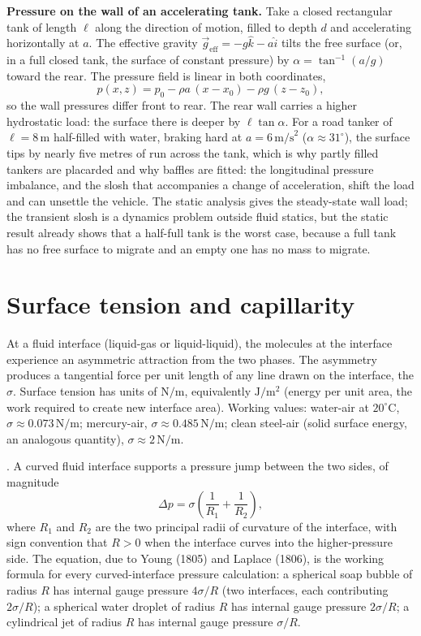 \begin{mastery}
\textbf{Pressure on the wall of an accelerating tank.} Take a closed
rectangular tank of length $\ell$ along the direction of motion, filled
to depth $d$ and accelerating horizontally at $a$. The effective gravity
$\vec{g}_{\text{eff}} = -g\hat{k} - a\hat{i}$ tilts the free surface (or,
in a full closed tank, the surface of constant pressure) by
$\alpha = \tan^{-1}(a/g)$ toward the rear. The pressure field is linear
in both coordinates,
\[
p(x,z) = p_0 - \rho a\,(x - x_0) - \rho g\,(z - z_0),
\]
so the wall pressures differ front to rear. The rear wall carries a
higher hydrostatic load: the surface there is deeper by
$\ell\tan\alpha$. For a road tanker of $\ell = 8\,\si{\meter}$
half-filled with water, braking hard at $a = 6\,\text{m/s}^2$
($\alpha \approx 31^{\circ}$), the surface tips by nearly five metres of
run across the tank, which is why partly filled tankers are placarded and
why baffles are fitted: the longitudinal pressure imbalance, and the
slosh that accompanies a change of acceleration, shift the load and can
unsettle the vehicle. The static analysis gives the steady-state wall
load; the transient slosh is a dynamics problem outside fluid statics,
but the static result already shows that a half-full tank is the worst
case, because a full tank has no free surface to migrate and an empty
one has no mass to migrate.
\end{mastery}

\section{Surface tension and capillarity}

At a fluid interface (liquid-gas or liquid-liquid), the molecules
at the interface experience an asymmetric attraction from the
two phases. The asymmetry produces a tangential force per unit
length of any line drawn on the interface, the
 $\sigma$. Surface tension has units of
$\text{N}/\text{m}$, equivalently $\text{J}/\text{m}^2$
(energy per unit area, the work required to create new interface
area). Working values: water-air at $20^{\circ}\text{C}$,
$\sigma \approx 0.073\,\text{N}/\text{m}$; mercury-air,
$\sigma \approx 0.485\,\text{N}/\text{m}$; clean steel-air
(solid surface energy, an analogous quantity), $\sigma \approx
2\,\text{N}/\text{m}$.

. A curved fluid interface
supports a pressure jump between the two sides, of magnitude
\[
\Delta p = \sigma \left(\frac{1}{R_1} + \frac{1}{R_2}\right),
\]
where $R_1$ and $R_2$ are the two principal radii of curvature of
the interface, with sign convention that $R > 0$ when the
interface curves into the higher-pressure side. The equation,
due to Young (1805) and Laplace (1806), is the working formula
for every curved-interface pressure calculation: a spherical
soap bubble of radius $R$ has internal gauge pressure $4\sigma/R$
(two interfaces, each contributing $2\sigma/R$); a spherical
water droplet of radius $R$ has internal gauge pressure
$2\sigma/R$; a cylindrical jet of radius $R$ has internal gauge
pressure $\sigma/R$.

